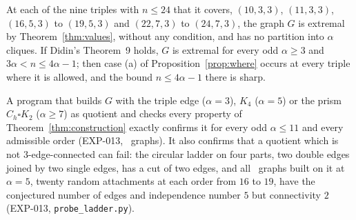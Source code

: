 \begin{corollary}\label{cor:construction}
At each of the nine triples with $n\le24$ that it covers, $(10,3,3)$, $(11,3,3)$, $(16,5,3)$ to $(19,5,3)$ and
$(22,7,3)$ to $(24,7,3)$, the graph $G$ is extremal by Theorem~\ref{thm:values}, without any condition, and has no
partition into $\alpha$ cliques. If Didin's Theorem~9 holds, $G$ is extremal for every odd $\alpha\ge3$ and $3\alpha<n\le4\alpha-1$;
then case (a) of Proposition~\ref{prop:where} occurs at every triple where it is allowed, and the bound $n\le4\alpha-1$
there is sharp.
\end{corollary}

A program that builds $G$ with the triple edge ($\alpha=3$), $K_4$ ($\alpha=5$) or the prism $C_h\square K_2$
($\alpha\ge7$) as quotient and checks every property of
Theorem~\ref{thm:construction} exactly confirms it for every odd $\alpha\le11$ and every admissible order
(EXP-013, \nconstructed\ graphs). It also confirms that a quotient which is not $3$-edge-connected can fail: the
circular ladder on four parts, two double edges joined by two single edges, has a cut of two edges, and all
\nladder\ graphs built on it at $\alpha=5$, twenty random attachments at each order from $16$ to $19$, have the
conjectured number of edges and independence number $5$ but connectivity $2$ (EXP-013, \texttt{probe\_ladder.py}).
